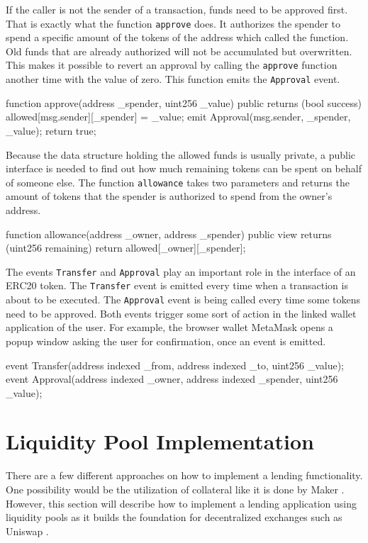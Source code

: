 If the caller is not the sender of a transaction, funds need to be approved first. That is exactly what the function \texttt{approve} does. It authorizes the spender to spend a specific amount of the tokens of the address which called the function. Old funds that are already authorized will not be accumulated but overwritten. This makes it possible to revert an approval by calling the \texttt{approve} function another time with the value of zero. This function emits the \texttt{Approval} event.
\begin{GenericCode}
function approve(address _spender, uint256 _value) public returns (bool success) {
  allowed[msg.sender][_spender] = _value;
  emit Approval(msg.sender, _spender, _value);
  return true;
}
\end{GenericCode}

Because the data structure holding the allowed funds is usually private, a public interface is needed to find out how much remaining tokens can be spent on behalf of someone else. The function \texttt{allowance} takes two parameters and returns the amount of tokens that the spender is authorized to spend from the owner's address.
\begin{GenericCode}
function allowance(address _owner, address _spender) public view returns (uint256 remaining) {
  return allowed[_owner][_spender];
}
\end{GenericCode}

The events \texttt{Transfer} and \texttt{Approval} play an important role in the interface of an ERC20 token. The \texttt{Transfer} event is emitted every time when a transaction is about to be executed. The \texttt{Approval} event is being called every time some tokens need to be approved. Both events trigger some sort of action in the linked wallet application of the user. For example, the browser wallet MetaMask opens a popup window asking the user for confirmation, once an event is emitted. 
\begin{GenericCode}
event Transfer(address indexed _from, address indexed _to, uint256 _value);
event Approval(address indexed _owner, address indexed _spender, uint256 _value);
\end{GenericCode}

\section{Liquidity Pool Implementation}
There are a few different approaches on how to implement a lending functionality. One possibility would be the utilization of collateral like it is
done by Maker \cite{MakerDAO2021}. However, this section will describe how to implement a lending application using liquidity pools as it builds the
foundation for decentralized exchanges such as Uniswap \cite{Uniswap2020}.

